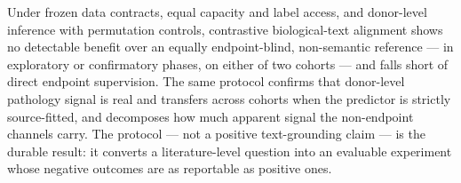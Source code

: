 \documentclass[11pt]{article}
\begin{document}
Under frozen data contracts, equal capacity and label access, and
donor-level inference with permutation controls, contrastive
biological-text alignment shows no detectable benefit over an equally
endpoint-blind, non-semantic reference --- in exploratory or
confirmatory phases, on either of two cohorts --- and falls short of
direct endpoint supervision. The same protocol confirms that
donor-level pathology signal is real and transfers across cohorts when
the predictor is strictly source-fitted, and decomposes how much
apparent signal the non-endpoint channels carry. The protocol --- not a
positive text-grounding claim --- is the durable result: it converts a
literature-level question into an evaluable experiment whose negative
outcomes are as reportable as positive ones.



\end{document}
